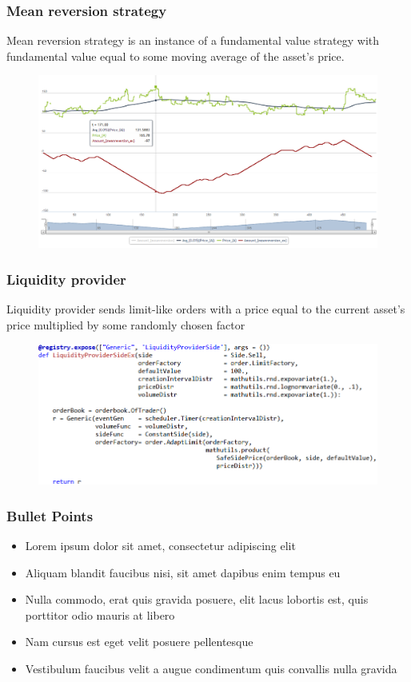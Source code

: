 \documentclass{beamer}
\begin{document}
\begin{frame}
\frametitle{Mean reversion strategy}
Mean reversion strategy is an instance of a fundamental value strategy with fundamental value equal to some moving average of the asset's price.
\begin{figure}[htbp]
\centering
\includegraphics[width=1\linewidth]{meanreversion.png}
\end{figure}
\end{frame}

\begin{frame}
\frametitle{Liquidity provider}
Liquidity provider sends limit-like orders with a price equal to the current asset's price multiplied by some randomly chosen factor 
\begin{figure}[htbp]
\centering
\includegraphics[width=1\linewidth]{liquidityprovider.png}
\end{figure}
\end{frame}

\begin{frame}
\frametitle{Bullet Points}
\begin{itemize}
\item Lorem ipsum dolor sit amet, consectetur adipiscing elit
\item Aliquam blandit faucibus nisi, sit amet dapibus enim tempus eu
\item Nulla commodo, erat quis gravida posuere, elit lacus lobortis est, quis porttitor odio mauris at libero
\item Nam cursus est eget velit posuere pellentesque
\item Vestibulum faucibus velit a augue condimentum quis convallis nulla gravida
\end{itemize}
\end{frame}
\end{document}
